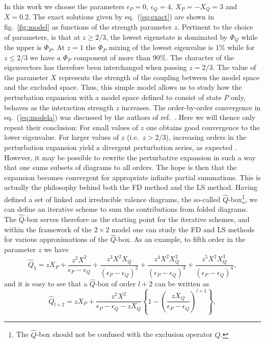 In this work we choose the parameters $\epsilon_P=0$, $\epsilon_Q=4$,
$X_P=-X_Q=3$ and $X=0.2$. The exact solutions
given by eq.\ (\ref{eq:exact})
are shown in fig.\ \ref{fig:model} as functions of the
strength parameter $z$. Pertinent to the choice of
parameters, is that at $z\geq 2/3$,  the lowest eigenstate is
dominated by $\Phi_Q$ while the upper is $\Phi_P$. At $z=1$ the
$\Phi_P$ mixing of the lowest eigenvalue
is $1\%$ while for $z\leq 2/3$
we have a $\Phi_P$ component of more than $90\%$.
The character of the eigenvectors has therefore been interchanged
when passing $z=2/3$. The value of the parameter $X$ represents the
strength of the coupling between the model space and the excluded space.
Thus, this simple
model allows us to study how the perturbation expansion with a
model space defined to consist of state $P$ only, behaves
as the interaction strength $z$ increases. The order-by-order
convergence in eq.\ (\ref{eq:modela}) was discussed by the authors
of ref.\ \cite{eo77}. Here we will thence only repeat
their conclusion:
For small values of $z$ one obtains
good convergence to the lower eigenvalue. For larger values of $z$ 
(i.e.\ $z> 2/3$),
increasing orders in the perturbation expansion yield a divergent
perturbation series, as expected \cite{sw72}.
However, it may be possible to rewrite
the perturbative expansion in such a way that one sums
subsets of diagrams to all orders. The hope is then that the
expansion becomes convergent for appropriate infinite partial
summations.
This is actually the philosophy
behind both the FD method and the LS method. Having defined
a set of linked and irreducible valence diagrams,
the so-called $\hat{Q}$-box\footnote{
The $\hat{Q}$-box should not be confused with the exclusion
operator $Q$.}, we can define an
iterative scheme to sum the contributions
from folded diagrams.
The $\hat{Q}$-box serves therefore as the starting point
for the iterative schemes, and within the framework of the
$2\times 2$ model one can
study the FD and LS methods for various
approximations of the $\hat{Q}$-box.
As an example, to fifth order in the parameter $z$ we have
\begin{equation}
       \hat{Q}_5=zX_P+\frac{z^2X^2}{\epsilon_P -\epsilon_Q}+
       \frac{z^3X^2X_Q}{(\epsilon_P -\epsilon_Q)^2}+
       \frac{z^4X^2X_Q^2}{(\epsilon_P -\epsilon_Q)^3}+
        \frac{z^5X^2X_Q^3}{(\epsilon_P -\epsilon_Q)^4},
       \label{eq:qapprox}
\end{equation}
and it
is easy to see that a $\hat{Q}$-box of order $l+2$ can be written
as
\[
               \hat{Q}_{l+2}=
                zX_P+\frac{z^2X^2}{\epsilon_P -\epsilon_Q-zX_Q}
                \left\{1-\left(\frac{zX_Q}
                {\epsilon_P-\epsilon_Q}\right)^{l+1}\right\},
\]

